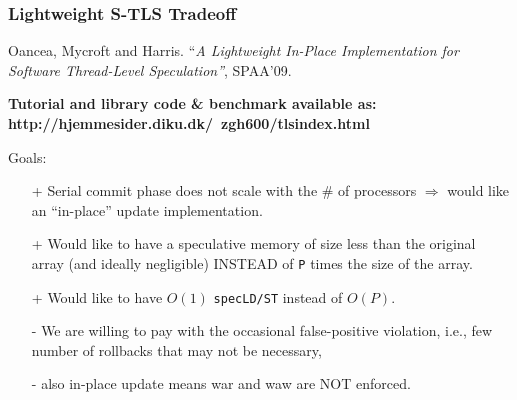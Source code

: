 \documentclass{beamer}
\newcommand{\emp}[1]{\textcolor{DikuRed}{ #1}}
\newcommand{\emphh}[1]{\textcolor{CosGreen}{ #1}}
\begin{document}
\begin{frame}[fragile,t]
  \frametitle{Lightweight S-TLS Tradeoff}

Oancea, Mycroft and Harris. 
``{\em A Lightweight In-Place Implementation for 
Software Thread-Level Speculation''}, SPAA'09.\medskip

{\bf Tutorial and library code \& benchmark available as:\\
http://hjemmesider.diku.dk/~zgh600/tlsindex.html}\medskip

\bigskip

Goals:
\begin{itemize}
    \item[+] \emphh{Serial commit phase does not scale with the 
                \# of processors $\Rightarrow$ would like an ``in-place'' 
                update implementation.}\medskip
    \item[+] \emphh{Would like to have a speculative memory of size less than the
            original array (and ideally negligible) 
            INSTEAD of {\tt P} times the size of the array.}\medskip
    \item[+] \emphh{Would like to have $O(1)$ {\tt specLD/ST} instead of $O(P)$.}\medskip
    \item[-] \emp{We are willing to pay with the occasional 
                false-positive violation, i.e., few number of rollbacks
                that may not be necessary,} 
    \item[-] \emp{also in-place update means {\sc war} and {\sc waw} are NOT enforced}.
\end{itemize}

\end{frame}
\end{document}
